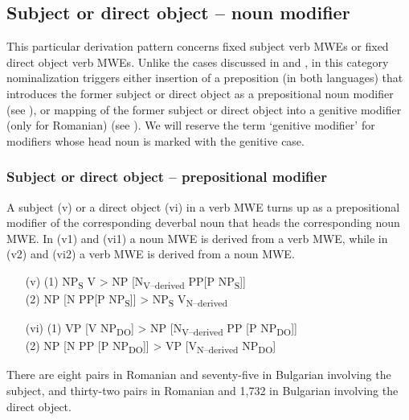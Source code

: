 \documentclass[output=paper]{langsci/langscibook}
\begin{document}
\subsection{Subject or direct object -- noun modifier}
\label{section63}

This particular derivation pattern concerns fixed subject verb MWEs or
fixed direct object verb MWEs. Unlike the cases discussed in  and
, in this category nominalization triggers either insertion of a
preposition (in both languages) that introduces the former subject or
direct object as a prepositional noun modifier (see ), or mapping
of the former subject or direct object into a genitive modifier (only
for Romanian) (see ). We will reserve the term ‘genitive modifier’
for modifiers whose head noun is marked with the genitive case.

\subsubsection{Subject or direct object -- prepositional modifier}
\label{section631}

A subject (v) or a direct object (vi) in a verb MWE turns up as a
prepositional modifier of the corresponding deverbal noun that heads
the corresponding noun MWE. In (v1) and (vi1) a noun MWE is derived
from a verb MWE, while in (v2) and (vi2) a verb MWE is derived from a
noun MWE.


\renewcommand{\theenumi}{(\roman{enumi})}%
\begin{enumerate}
 \setcounter{enumi}{4}
\item[(v)]  (1) NP\textsubscript{S} V > NP [N\textsubscript{V–derived }PP[P
NP\textsubscript{S}]] \\
(2) NP [N PP[P NP\textsubscript{S}]] > NP\textsubscript{S}
V\textsubscript{N–derived} 
\end{enumerate}

\renewcommand{\theenumi}{(\roman{enumi})}%
\begin{enumerate}
 \setcounter{enumi}{5} 
 \item[(vi)] (1) VP [V NP\textsubscript{DO}] > NP [N\textsubscript{V–derived} PP
[P NP\textsubscript{DO}]] \\ 
(2) NP [N PP [P NP\textsubscript{DO}]] > VP
[V\textsubscript{N–derived} NP\textsubscript{DO}] 
\end{enumerate}


There are eight pairs in Romanian and seventy-five in Bulgarian involving the subject,
and thirty-two pairs in Romanian and 1,732 in Bulgarian involving the direct
object. 
\end{document}
